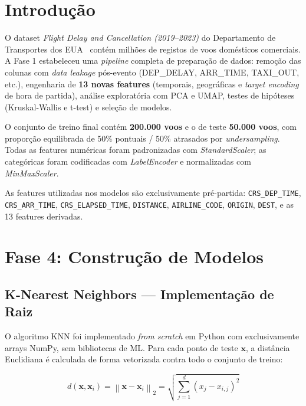 \documentclass[conference]{IEEEtran}
\begin{document}
\section{Introdução}

O dataset \textit{Flight Delay and Cancellation (2019–2023)} do Departamento de
Transportes dos EUA~\cite{dataset} contém milhões de registos de voos domésticos
comerciais. A Fase 1 estabeleceu uma \textit{pipeline} completa de preparação de
dados: remoção das colunas com \textit{data leakage} pós-evento (DEP\_DELAY,
ARR\_TIME, TAXI\_OUT, etc.), engenharia de \textbf{13 novas features} (temporais,
geográficas e \textit{target encoding} de hora de partida), análise exploratória com
PCA e UMAP, testes de hipóteses (Kruskal-Wallis e t-test) e seleção de modelos.

O conjunto de treino final contém \textbf{200.000 voos} e o de teste \textbf{50.000
voos}, com proporção equilibrada de 50\% pontuais / 50\% atrasados por
\textit{undersampling}. Todas as features numéricas foram padronizadas com
\textit{StandardScaler}; as categóricas foram codificadas com \textit{LabelEncoder}
e normalizadas com \textit{MinMaxScaler}.

As features utilizadas nos modelos são exclusivamente pré-partida: \texttt{CRS\_DEP\_TIME},
\texttt{CRS\_ARR\_TIME}, \texttt{CRS\_ELAPSED\_TIME}, \texttt{DISTANCE},
\texttt{AIRLINE\_CODE}, \texttt{ORIGIN}, \texttt{DEST}, e as 13 features derivadas.

\section{Fase 4: Construção de Modelos}

\subsection{K-Nearest Neighbors — Implementação de Raiz}

O algoritmo KNN foi implementado \textit{from scratch} em Python com exclusivamente
arrays NumPy, sem bibliotecas de ML. Para cada ponto de teste $\mathbf{x}$, a
distância Euclidiana é calculada de forma vetorizada contra todo o conjunto de treino:

\begin{equation}
d(\mathbf{x}, \mathbf{x}_i) = \left\|\mathbf{x} - \mathbf{x}_i\right\|_2
= \sqrt{\sum_{j=1}^{d}(x_j - x_{i,j})^2}
\end{equation}
\end{document}
